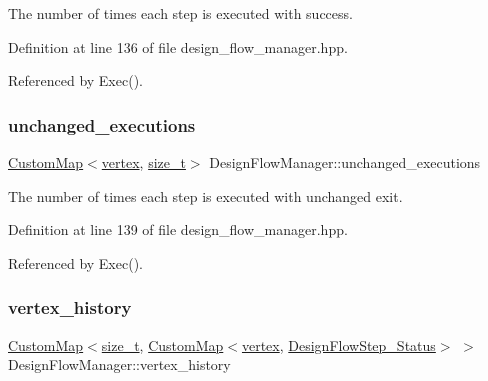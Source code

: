 The number of times each step is executed with success. 



Definition at line 136 of file design\+\_\+flow\+\_\+manager.\+hpp.



Referenced by Exec().

\mbox{\label{classDesignFlowManager_a5d95ea33043a9a5b10a583d0601ab0f3}} 
\subsubsection{\texorpdfstring{unchanged\+\_\+executions}{unchanged\_executions}}
{\footnotesize\ttfamily \hyperlink{custom__map_8hpp_a18ca01763abbe3e5623223bfe5aaac6b}{Custom\+Map}$<$\hyperlink{graph_8hpp_abefdcf0544e601805af44eca032cca14}{vertex}, \hyperlink{tutorial__fpt__2017_2intro_2sixth_2test_8c_a7c94ea6f8948649f8d181ae55911eeaf}{size\+\_\+t}$>$ Design\+Flow\+Manager\+::unchanged\+\_\+executions\hspace{0.3cm}{\ttfamily [private]}}



The number of times each step is executed with unchanged exit. 



Definition at line 139 of file design\+\_\+flow\+\_\+manager.\+hpp.



Referenced by Exec().

\mbox{\label{classDesignFlowManager_a2ca7c1db5d0b6cbea2c118601cbe1948}} 
\subsubsection{\texorpdfstring{vertex\+\_\+history}{vertex\_history}}
{\footnotesize\ttfamily \hyperlink{custom__map_8hpp_a18ca01763abbe3e5623223bfe5aaac6b}{Custom\+Map}$<$\hyperlink{tutorial__fpt__2017_2intro_2sixth_2test_8c_a7c94ea6f8948649f8d181ae55911eeaf}{size\+\_\+t}, \hyperlink{custom__map_8hpp_a18ca01763abbe3e5623223bfe5aaac6b}{Custom\+Map}$<$\hyperlink{graph_8hpp_abefdcf0544e601805af44eca032cca14}{vertex}, \hyperlink{design__flow__step_8hpp_afb1f0d73069c26076b8d31dbc8ebecdf}{Design\+Flow\+Step\+\_\+\+Status}$>$ $>$ Design\+Flow\+Manager\+::vertex\+\_\+history\hspace{0.3cm}{\ttfamily [private]}}



